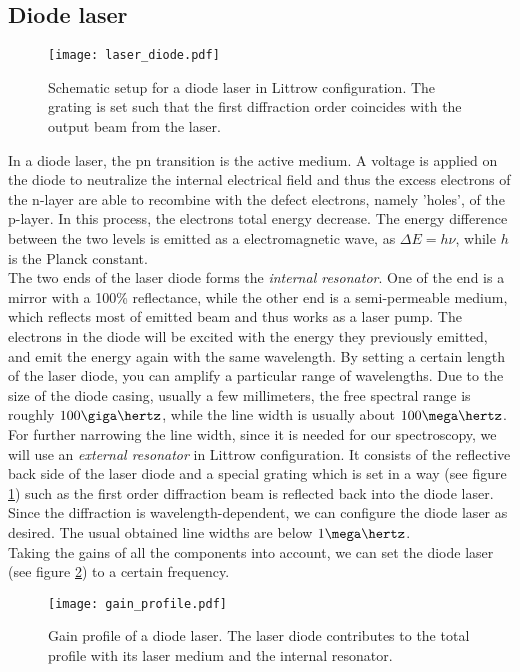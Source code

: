 \subsection{Diode laser}
\begin{figure}[h]
	\centering
	\texttt{[image: laser\_diode.pdf]}
	\caption{Schematic setup for a diode laser in Littrow configuration. The grating is set such that the first diffraction order coincides with the output beam from the laser.}
	\label{fig:laser_diode}
\end{figure}
In a diode laser, the pn transition is the active medium. A voltage is applied on the diode to neutralize the internal electrical field and thus the excess electrons of the n-layer are able to recombine with the defect electrons, namely 'holes', of the p-layer. In this process, the electrons total energy decrease. The energy difference between the two levels is emitted as a electromagnetic wave, as $\Delta E=h\nu$, while $h$ is the Planck constant.\\
The two ends of the laser diode forms the \emph{internal resonator}. One of the end is a mirror with a 100\% reflectance, while the other end is a semi-permeable medium, which reflects most of emitted beam and thus works as a laser pump. The electrons in the diode will be excited with the energy they previously emitted, and emit the energy again with the same wavelength. By setting a certain length of the laser diode, you can amplify a particular range of wavelengths. Due to the size of the diode casing, usually a few millimeters, the free spectral range is roughly $100\giga\hertz$, while the line width is usually about $100\mega\hertz$.\\
For further narrowing the line width, since it is needed for our spectroscopy, we will use an \emph{external resonator} in Littrow configuration. It consists of the reflective back side of the laser diode and a special grating which is set in a way (see figure \ref{fig:laser_diode}) such as the first order diffraction beam is reflected back into the diode laser. Since the diffraction is wavelength-dependent, we can configure the diode laser as desired. The usual obtained line widths are below $1\mega\hertz$.\\
Taking the gains of all the components into account, we can set the diode laser (see figure \ref{fig:gain_profiles}) to a certain frequency.
\begin{figure}[h]
	\centering
	\texttt{[image: gain\_profile.pdf]}
	\caption{Gain profile of a diode laser. The laser diode contributes to the total profile with its laser medium and the internal resonator. }
	\label{fig:gain_profiles}
\end{figure}

